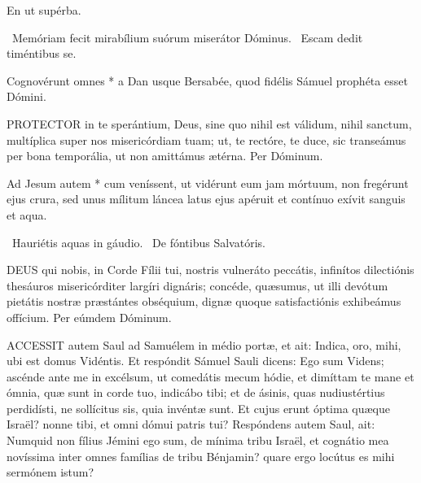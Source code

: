  En ut supérba. 

\V\ Memóriam fecit mirabílium suórum miserátor Dóminus. \R\ Escam dedit timéntibus se.

 Cognovérunt omnes * a Dan usque Bersabée, quod fidélis Sámuel prophéta esset Dómini.


\lettrine[lines=2]{P}{ROTECTOR} in te sperántium, Deus, sine quo nihil est válidum, nihil sanctum, multíplica super nos misericórdiam tuam; ut, te rectóre, te duce, sic transeámus per bona temporália, ut non amittámus ætérna. Per Dóminum.


 Ad Jesum autem * cum veníssent, ut vidérunt eum jam mórtuum, non fregérunt ejus crura, sed unus mílitum láncea latus ejus apéruit et contínuo exívit sanguis et aqua.

\V\ Hauriétis aquas in gáudio. \R\ De fóntibus Salvatóris.


\lettrine[lines=2]{D}{EUS} qui nobis, in Corde Fílii tui, nostris vulneráto peccátis, infinítos dilectiónis thesáuros misericórditer largíri dignáris; concéde, quæsumus, ut illi devótum pietátis nostræ præstántes obséquium, dignæ quoque satisfactiónis exhibeámus offícium. Per eúmdem Dóminum.






\lettrine[lines=2]{A}{CCESSIT} autem Saul ad Samuélem in médio portæ, et ait: Indica, oro, mihi, ubi est domus Vidéntis. Et respóndit Sámuel Sauli dicens: Ego sum Videns; ascénde ante me in excélsum, ut comedátis mecum hódie, et dimíttam te mane et ómnia, quæ sunt in corde tuo, indicábo tibi; et de ásinis, quas nudiustértius perdidísti, ne sollícitus sis, quia invéntæ sunt. Et cujus erunt óptima quæque Israël? nonne tibi, et omni dómui patris tui? Respóndens autem Saul, ait: Numquid non fílius Jémini ego sum, de mínima tribu Israël, et cognátio mea novíssima inter omnes famílias de tribu Bénjamin? quare ergo locútus es mihi sermónem istum?

